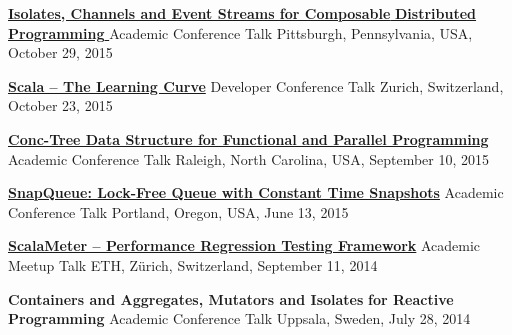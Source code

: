 \documentclass[9pt]{article}
\begin{document}
\noindent\href{http://axel22.github.io/resources/docs/onward15.pdf}
{\bf Isolates, Channels and Event Streams for Composable }
\vspace{-0.03in}
\newline
\noindent\href{http://axel22.github.io/resources/docs/onward15.pdf}
{\bf Distributed Programming }
\newline\noindent Academic Conference Talk
\dates{}
\linebreak\noindent Pittsburgh, Pennsylvania, USA, October 29, 2015
\bigskip

\noindent\href{http://axel22.github.io/resources/docs/jazoon15.pdf}
{\bf Scala -- The Learning Curve}
\vspace{-0.03in}
\newline\noindent Developer Conference Talk
\dates{}
\linebreak\noindent Zurich, Switzerland, October 23, 2015
\bigskip

\noindent\href{http://axel22.github.io/slides/conc.html#/}
{\bf Conc-Tree Data Structure for Functional and Parallel Programming}
\vspace{-0.03in}
\newline\noindent Academic Conference Talk
\dates{}
\linebreak\noindent Raleigh, North Carolina, USA, September 10, 2015
\bigskip

\noindent\href{http://axel22.github.io/slides/snapq.html#/}
{\bf SnapQueue: Lock-Free Queue with Constant Time Snapshots}
\vspace{-0.03in}
\newline\noindent Academic Conference Talk
\dates{}
\linebreak\noindent Portland, Oregon, USA, June 13, 2015
\bigskip

\noindent\href{https://speakerdeck.com/axel22/scalameter-in-2014}
{\bf ScalaMeter -- Performance Regression Testing Framework}
\vspace{-0.03in}
\newline\noindent Academic Meetup Talk
\dates{}
\linebreak\noindent ETH, Zürich, Switzerland, September 11, 2014
\bigskip

\noindent
{\bf Containers and Aggregates, Mutators and Isolates }
\vspace{-0.03in}
\newline
{\bf for Reactive Programming}
\dates{}
\newline\noindent Academic Conference Talk
\dates{}
\linebreak\noindent Uppsala, Sweden, July 28, 2014
\bigskip
\end{document}
